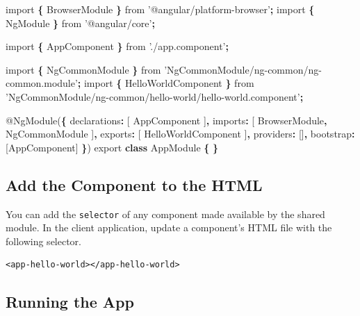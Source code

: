 \documentclass[]{book}
\newenvironment{Shaded}{\begin{snugshade}}{\end{snugshade}}
\newcommand{\KeywordTok}[1]{\textcolor[rgb]{0.13,0.29,0.53}{\textbf{#1}}}
\newcommand{\DataTypeTok}[1]{\textcolor[rgb]{0.13,0.29,0.53}{#1}}
\newcommand{\StringTok}[1]{\textcolor[rgb]{0.31,0.60,0.02}{#1}}
\newcommand{\ImportTok}[1]{#1}
\newcommand{\OperatorTok}[1]{\textcolor[rgb]{0.81,0.36,0.00}{\textbf{#1}}}
\newcommand{\AttributeTok}[1]{\textcolor[rgb]{0.77,0.63,0.00}{#1}}
\newcommand{\NormalTok}[1]{#1}
\theoremstyle{definition}
\theoremstyle{definition}
\theoremstyle{definition}
\theoremstyle{remark}
\begin{document}
\begin{Shaded}
\begin{Highlighting}[]
\ImportTok{import} \OperatorTok{\{}\NormalTok{ BrowserModule }\OperatorTok{\}} \ImportTok{from} \StringTok{'@angular/platform-browser'}\OperatorTok{;}
\ImportTok{import} \OperatorTok{\{}\NormalTok{ NgModule }\OperatorTok{\}} \ImportTok{from} \StringTok{'@angular/core'}\OperatorTok{;}

\ImportTok{import} \OperatorTok{\{}\NormalTok{ AppComponent }\OperatorTok{\}} \ImportTok{from} \StringTok{'./app.component'}\OperatorTok{;}

\ImportTok{import} \OperatorTok{\{}\NormalTok{ NgCommonModule }\OperatorTok{\}} \ImportTok{from} \StringTok{'NgCommonModule/ng-common/ng-common.module'}\OperatorTok{;}
\ImportTok{import} \OperatorTok{\{}\NormalTok{ HelloWorldComponent }\OperatorTok{\}} \ImportTok{from} \StringTok{'NgCommonModule/ng-common/hello-world/hello-world.component'}\OperatorTok{;}

\NormalTok{@}\AttributeTok{NgModule}\NormalTok{(}\OperatorTok{\{}
  \DataTypeTok{declarations}\OperatorTok{:}\NormalTok{ [}
\NormalTok{    AppComponent}
\NormalTok{  ]}\OperatorTok{,}
  \DataTypeTok{imports}\OperatorTok{:}\NormalTok{ [}
\NormalTok{    BrowserModule}\OperatorTok{,}
\NormalTok{    NgCommonModule}
\NormalTok{  ]}\OperatorTok{,}
  \DataTypeTok{exports}\OperatorTok{:}\NormalTok{ [}
\NormalTok{    HelloWorldComponent}
\NormalTok{  ]}\OperatorTok{,}
  \DataTypeTok{providers}\OperatorTok{:}\NormalTok{ []}\OperatorTok{,}
  \DataTypeTok{bootstrap}\OperatorTok{:}\NormalTok{ [AppComponent]}
\OperatorTok{\}}\NormalTok{)}
\ImportTok{export} \KeywordTok{class}\NormalTok{ AppModule }\OperatorTok{\{} \OperatorTok{\}}
\end{Highlighting}
\end{Shaded}

\subsection{Add the Component to the
HTML}\label{add-the-component-to-the-html}

You can add the \texttt{selector} of any component made available by the
shared module. In the client application, update a component's HTML file
with the following selector.

\begin{verbatim}
<app-hello-world></app-hello-world>
\end{verbatim}

\subsection{Running the App}\label{running-the-app}
\end{document}
